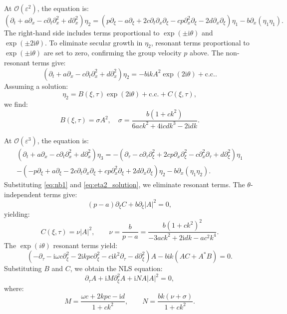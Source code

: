 \documentclass[alpha-refs, 12pt]{wiley-article}
\renewcommand{\O}{\mathcal{O}}
\newcommand{\ui}{\mathrm{i}}
\newcommand{\eps}{\varepsilon}
\begin{document}
At $\O(\eps^2)$, the equation is:
\begin{equation}\label{eq:second_order}
  \left( \partial_t + a \partial_x - c \partial_t \partial_x^2 + d \partial_x^2 \right) \eta_2 = \left( p \partial_\xi - a \partial_\xi + 2 c \partial_t \partial_x \partial_\xi - c p \partial_x^2 \partial_\xi - 2 d \partial_x \partial_\xi \right) \eta_1 - b \partial_x (\eta_1 \eta_1).
\end{equation}
The right-hand side includes terms proportional to $\exp(\pm \ui \theta)$ and $\exp(\pm 2 \ui \theta)$. To eliminate secular growth in $\eta_2$, resonant terms proportional to $\exp(\pm \ui \theta)$ are set to zero, confirming the group velocity $p$ above. The non-resonant terms give:
\begin{equation}\label{eq:second_order_nonresonant}
  \left( \partial_t + a \partial_x - c \partial_t \partial_x^2 + d \partial_x^2 \right) \eta_2 = - b \ui k A^2 \exp(2 \ui \theta) + \text{c.c.}.
\end{equation}
Assuming a solution:
\begin{equation}\label{eq:eta2_solution}
  \eta_2 = B(\xi, \tau) \exp(2 \ui \theta) + \text{c.c.} + C(\xi, \tau),
\end{equation}
we find:
\begin{equation}\label{eq:B_solution}
  B(\xi, \tau) = \sigma A^2, \quad \sigma = \frac{b (1 + c k^2)}{6 a c k^2 + 4 \ui c d k^3 - 2 \ui d k}.
\end{equation}

At $\O(\eps^3)$, the equation is:
\begin{multline}\label{eq:third_order}
  \left( \partial_t + a \partial_x - c \partial_t \partial_x^2 + d \partial_x^2 \right) \eta_3 = - \left( \partial_\tau - c \partial_\tau \partial_\xi^2 + 2 c p \partial_x \partial_\xi^2 - c \partial_x^2 \partial_\tau + d \partial_\xi^2 \right) \eta_1 \\
- \left( -p \partial_\xi + a \partial_\xi - 2 c \partial_t \partial_x \partial_\xi + c p \partial_x^2 \partial_\xi + 2 d \partial_x \partial_\xi \right) \eta_2 - b \partial_x (\eta_1 \eta_2).
\end{multline}
Substituting \eqref{eq:nb1} and \eqref{eq:eta2_solution}, we eliminate resonant terms. The $\theta$-independent terms give:
\begin{equation}\label{eq:C_equation}
  (p - a) \partial_\xi C + b \partial_\xi |A|^2 = 0,
\end{equation}
yielding:
\[
  C(\xi, \tau) = \nu |A|^2, \qquad \nu = \frac{b}{p - a} = \frac{b (1 + c k^2)^2}{-3 a c k^2 + 2 \ui d k - a c^2 k^4}.
\]
The $\exp(i \theta)$ resonant terms yield:
\begin{equation}\label{eq:resonance_bbm}
  \left( -\partial_\tau - \ui \omega c \partial_\xi^2 - 2 \ui k p c \partial_\xi^2 - c \ui k^2 \partial_\tau - d \partial_\xi^2 \right) A - b \ui k (A C + A^* B) = 0.
\end{equation}
Substituting $B$ and $C$, we obtain the NLS equation:
\begin{equation}\label{eq:NLSBBM}
  \partial_\tau A + \ui M \partial_\xi^2 A + \ui N A |A|^2 = 0,
\end{equation}
where:
\[
  M = \frac{\omega c + 2 k p c - \ui d}{1 + c k^2}, \qquad N = \frac{b k (\nu + \sigma)}{1 + c k^2}.
\]
\end{document}
